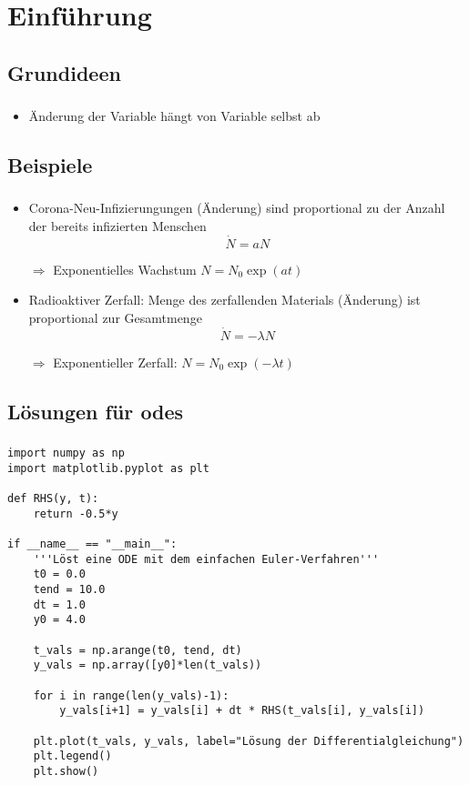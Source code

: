 \section{Einführung}
\label{sec:Introduction}


\subsection{Grundideen}
\label{subsec:basic-concepts}
\begin{frame}
	\frametitle{\insertsubsection}
	\begin{itemize}[<+->]
		\item Änderung der Variable hängt von Variable selbst ab

	\end{itemize}
\end{frame}


\subsection{Beispiele}
\label{subsec:examples}
\begin{frame}
	\frametitle{\insertsubsection}
	\begin{itemize}[<+->]
		\item Corona-Neu-Infizierungungen (Änderung) sind proportional zu der Anzahl der bereits infizierten Menschen
		\[\dot{N} = a N\]
		\item[$\Rightarrow$] Exponentielles Wachstum $N=N_0\exp(at)$
		\item Radioaktiver Zerfall: Menge des zerfallenden Materials (Änderung) ist proportional zur Gesamtmenge
		\[\dot{N} = -\lambda N\]
		\item[$\Rightarrow$] Exponentieller Zerfall: $N=N_0\exp(-\lambda t)$
	\end{itemize}
\end{frame}


\subsection{Lösungen für \acsp{ode}}
\label{subsec:solving}
\begin{frame}[fragile]
	\frametitle{\insertsubsection}
	\begin{verbatim}
import numpy as np
import matplotlib.pyplot as plt

def RHS(y, t):
    return -0.5*y

if __name__ == "__main__":
    '''Löst eine ODE mit dem einfachen Euler-Verfahren'''
    t0 = 0.0
    tend = 10.0
    dt = 1.0
    y0 = 4.0

    t_vals = np.arange(t0, tend, dt)
    y_vals = np.array([y0]*len(t_vals))

    for i in range(len(y_vals)-1):
        y_vals[i+1] = y_vals[i] + dt * RHS(t_vals[i], y_vals[i])

    plt.plot(t_vals, y_vals, label="Lösung der Differentialgleichung")
    plt.legend()
    plt.show()

	\end{verbatim}
\end{frame}


